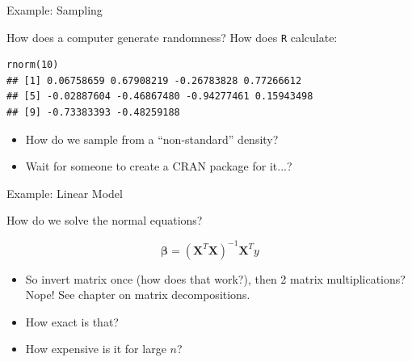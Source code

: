 \documentclass[11pt,compress,t,notes=noshow, xcolor=table]{beamer}
\begin{document}

%
%
%
%
%
\normalsize
\begin{vbframe}{Example: Sampling}

How does a computer generate randomness?
How does \texttt{R} calculate:
\lz
\footnotesize
\begin{verbatim}
rnorm(10)
## [1] 0.06758659 0.67908219 -0.26783828 0.77266612
## [5] -0.02887604 -0.46867480 -0.94277461 0.15943498
## [9] -0.73383393 -0.48259188
\end{verbatim}


\normalsize
\lz
\begin{itemize}
\item How do we sample from a \enquote{non-standard} density?
\item Wait for someone to create a CRAN package for it...?
\end{itemize}

\end{vbframe}

\begin{vbframe}{Example: Linear Model}

How do we solve the normal equations?

  $$ \boldsymbol{\beta} = (\mathbf{X}^T \mathbf{X})^{-1} \mathbf{X}^T y $$

\begin{itemize}
\item So invert matrix once (how does that work?),
  then 2 matrix multiplications? Nope! See chapter on matrix decompositions.
\item How exact is that?
\item How expensive is it for large $n$?
\end{itemize}

\end{vbframe}
\end{document}
